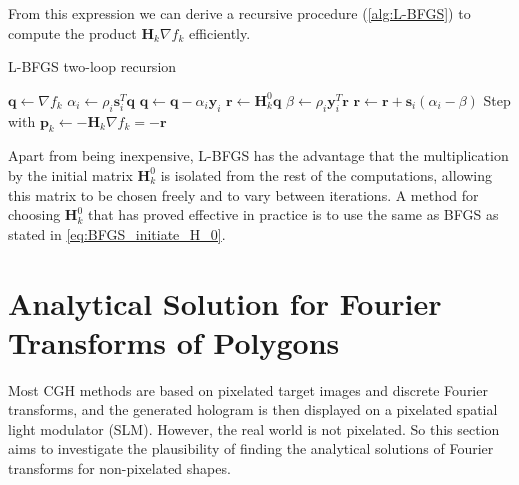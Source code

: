 From this expression we can derive a recursive procedure (\cref{alg:L-BFGS}) to compute the product $\textbf{H}_{k} \nabla f_k$ efficiently.

\begin{algorithm}[H]
  \caption{L-BFGS two-loop recursion \cite{Nocedal2006}}\label{alg:L-BFGS}
  \begin{algorithmic}
    \State $\textbf{q} \gets \nabla f_k$
    \State $\alpha_i \gets \rho_i \textbf{s}_i^T \textbf{q}$
    \State $ \textbf{q} \gets \textbf{q} - \alpha_i\textbf{y}_i$
    \EndFor
    \State $\textbf{r}\gets \textbf{H}_k^0 \textbf{q}$
    \State $\beta \gets \rho_i \textbf{y}_i^T \textbf{r}$
    \State $ \textbf{r} \gets \textbf{r} +\textbf{s}_i (\alpha_i-\beta)$
    \EndFor
    \State Step with $\textbf{p}_k \gets -\textbf{H}_k \nabla f_{k} = -\textbf{r}$
  \end{algorithmic}
\end{algorithm}

Apart from being inexpensive, L-BFGS has the advantage that the multiplication by the initial matrix $\textbf{H}_k^0$ is isolated from the rest of the computations, allowing this matrix to be chosen freely and to vary between iterations. A method for choosing $\textbf{H}_k^0$ that has proved effective in practice is to use the same as BFGS as stated in \cref{eq:BFGS_initiate_H_0}. \cite{Nocedal2006}






\newpage
\section{Analytical Solution for Fourier Transforms of Polygons}\label{sec:Analytical Solution for Fourier Transforms of Polygons}
Most CGH methods are based on pixelated target images and discrete Fourier transforms, and the generated hologram is then displayed on a pixelated spatial light modulator (SLM). However, the real world is not pixelated. So this section aims to investigate the plausibility of finding the analytical solutions of Fourier transforms for non-pixelated shapes.

